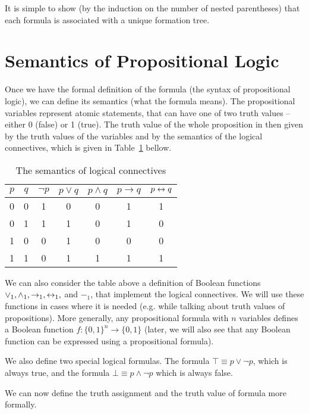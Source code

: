 It is simple to show (by the induction on the number of nested parentheses) that each formula is associated with a unique formation tree. 

\section{Semantics of Propositional Logic}

Once we have the formal definition of the formula (the syntax of propositional logic), we can define its semantics (what the formula means). The propositional variables represent atomic statements, that can have one of two truth values -- either 0 (false) or 1 (true). The truth value of the whole proposition in then given by the truth values of the variables and by the semantics of the logical connectives, which is given in Table~\ref{tab:prop_semantics} bellow.

\begin{table}[h]
\centering
\caption{The semantics of logical connectives}
\label{tab:prop_semantics}
\begin{tabular}{cc|ccccc}
\toprule
$p$ & $q$ & $\neg p$ & $p \lor q$ & $p \land q$ & $p \to q$ & $p \leftrightarrow q$ \\
\midrule
0 & 0 & 1 & 0 & 0 & 1 & 1 \\
0 & 1 & 1 & 1 & 0 & 1 & 0 \\
1 & 0 & 0 & 1 & 0 & 0 & 0 \\
1 & 1 & 0 & 1 & 1 & 1 & 1 \\
\bottomrule
\end{tabular}
\end{table}

We can also consider the table above a definition of Boolean functions $\lor_1, \land_1, \to_1, \leftrightarrow_1,$ and $-_1$, that implement the logical connectives. We will use these functions in cases where it is needed (e.g. while talking about truth values of propositions). More generally, any propositional formula with $n$ variables defines a Boolean function $f: \{0,1\}^n \to \{0,1\}$ (later, we will also see that any Boolean function can be expressed using a propositional formula).

We also define two special logical formulas. The formula $\top \equiv p \lor \neg p$, which is always true, and the formula $\bot \equiv p \land \neg p$ which is always false.

We can now define the truth assignment and the truth value of formula more formally.

